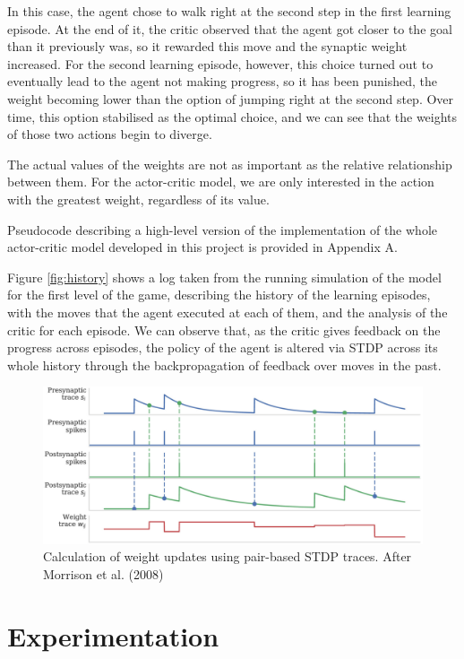 \documentclass[10pt]{article}
\begin{document}
    In this case, the agent chose to walk right at the second step in the first learning episode. At the end of it, the critic observed that the agent got closer to the goal than it previously was, so it rewarded this move and the synaptic weight increased. For the second learning episode, however, this choice turned out to eventually lead to the agent not making progress, so it has been punished, the weight becoming lower than the option of jumping right at the second step. Over time, this option stabilised as the optimal choice, and we can see that the weights of those two actions begin to diverge.

    The actual values of the weights are not as important as the relative relationship between them. For the actor-critic model, we are only interested in the action with the greatest weight, regardless of its value.

    Pseudocode describing a high-level version of the implementation of the whole actor-critic model developed in this project is provided in Appendix A.

    Figure \ref{fig:history} shows a log taken from the running simulation of the model for the first level of the game, describing the history of the learning episodes, with the moves that the agent executed at each of them, and the analysis of the critic for each episode. We can observe that, as the critic gives feedback on the progress across episodes, the policy of the agent is altered via STDP across its whole history through the backpropagation of feedback over moves in the past.
    
    \begin{figure}[b]
    \center
    \includegraphics[width=155mm]{./spikeTraces.png}
    \caption{Calculation of weight updates using pair-based STDP traces. After Morrison et al. (2008)}
    \label{fig:spikeTraces}
    \end{figure}

    \section{Experimentation}
\end{document}
